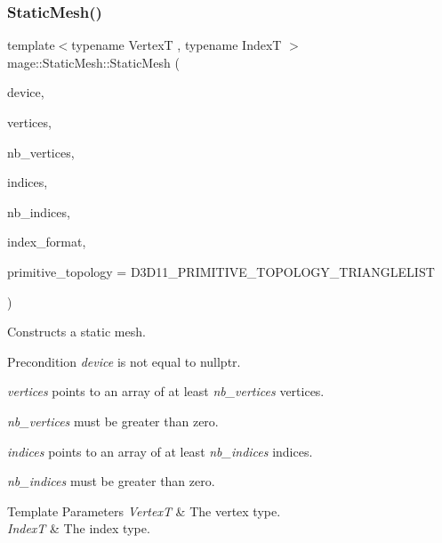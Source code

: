 \subsubsection{\texorpdfstring{Static\+Mesh()}{StaticMesh()}\hspace{0.1cm}{\footnotesize\ttfamily [2/6]}}
{\footnotesize\ttfamily template$<$typename VertexT , typename IndexT $>$ \\
mage\+::\+Static\+Mesh\+::\+Static\+Mesh (\begin{DoxyParamCaption}\item[{I\+D3\+D11\+Device5 $\ast$}]{device,  }\item[{const VertexT $\ast$}]{vertices,  }\item[{size\+\_\+t}]{nb\+\_\+vertices,  }\item[{const IndexT $\ast$}]{indices,  }\item[{size\+\_\+t}]{nb\+\_\+indices,  }\item[{D\+X\+G\+I\+\_\+\+F\+O\+R\+M\+AT}]{index\+\_\+format,  }\item[{D3\+D11\+\_\+\+P\+R\+I\+M\+I\+T\+I\+V\+E\+\_\+\+T\+O\+P\+O\+L\+O\+GY}]{primitive\+\_\+topology = {\ttfamily D3D11\+\_\+PRIMITIVE\+\_\+TOPOLOGY\+\_\+TRIANGLELIST} }\end{DoxyParamCaption})\hspace{0.3cm}{\ttfamily [explicit]}}

Constructs a static mesh.

\begin{DoxyPrecond}{Precondition}
{\itshape device} is not equal to {\ttfamily nullptr}. 

{\itshape vertices} points to an array of at least {\itshape nb\+\_\+vertices} vertices. 

{\itshape nb\+\_\+vertices} must be greater than zero. 

{\itshape indices} points to an array of at least {\itshape nb\+\_\+indices} indices. 

{\itshape nb\+\_\+indices} must be greater than zero. 
\end{DoxyPrecond}

\begin{DoxyTemplParams}{Template Parameters}
{\em VertexT} & The vertex type. \\
\hline
{\em IndexT} & The index type. \\
\hline
\end{DoxyTemplParams}

